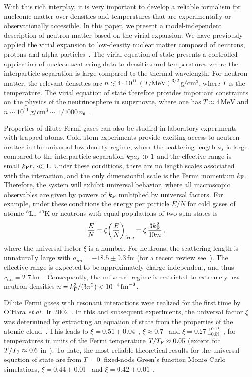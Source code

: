 \documentclass[aps,prc,twocolumn,showpacs,showkeys,amsmath,amssymb]{revtex4}
\newcommand{\kf}{k_{\rm F}}
\newcommand{\as}{a_s}
\newcommand{\re}{r_e}
\newcommand{\be}{\begin{equation}}
\newcommand{\ee}{\end{equation}}
\newcommand{\fm}{\, \text{fm}}
\newcommand{\mev}{\, \text{MeV}}
\newcommand{\gcq}{\, \text{g}/\text{cm}^{3}}
\begin{document}
With this rich interplay, it is very important to develop a reliable 
formalism for nucleonic matter over densities and temperatures 
that are experimentally or observationally accessible. In this 
paper, we present a model-independent description of neutron matter 
based on the virial expansion. We have previously applied the
virial expansion to low-density nuclear matter composed of neutrons, 
protons and alpha particles~\cite{vEOSnuc}.
The virial equation of state presents a controlled application of
nucleon scattering data to densities and temperatures where the 
interparticle separation is large compared to the thermal wavelength. 
For neutron matter, the relevant densities are
$n \lesssim 4 \cdot 10^{11} \, (T/\text{MeV})^{3/2} \gcq$,
where $T$ is the temperature. The virial equation of state
therefore provides important constraints on the physics of the
neutrinosphere in supernovae, where one has $T \approx 4 \mev$ 
and $n \sim 10^{11} \gcq \sim 1/1000 \, n_0$~\cite{sn1987a1,sn1987a2}.

Properties of dilute Fermi gases can also be studied in laboratory 
experiments with trapped atoms. Cold atom experiments provide
exciting access to neutron matter in the universal low-density
regime, where the scattering length $\as$ is large compared to
the interparticle separation $\kf \as \gg 1$ and the effective
range is small $\kf \re \ll 1$. Under these conditions, there 
are no length scales associated with the interaction, and the 
only dimensionful scale is the Fermi momentum $\kf$. Therefore, the
system will exhibit universal behavior, where all macroscopic 
observables are given by powers of $\kf$
multiplied by universal factors. For example, under these conditions 
the energy per particle $E/N$ for cold gases of atomic $^6$Li, $^{40}$K 
or neutrons with equal populations of two spin states is
\be
\frac{E}{N} = \xi \biggl( \frac{E}{N} \biggr)_{\rm free} = \xi \,
\frac{3 \kf^2}{10 m} \,,
\label{unieos}
\ee
where the universal factor $\xi$ is a number. For neutrons, the scattering 
length is unnaturally large with $a_{nn} = - 18.5 \pm 0.3 \fm$ (for a recent 
review see~\cite{Phillips}).
The effective range is expected to be approximately charge-independent,
and thus $r_{nn} = 2.7 \fm$~\cite{effrange}. Consequently, the universal
regime is restricted to extremely low neutron densities $n = \kf^3/
(3\pi^2) < 10^{-4} \fm^{-3}$.

Dilute Fermi gases with resonant interactions were realized for 
the first time by O'Hara {\it et al.}~in 2002~\cite{Thomas1}. In this
and subsequent experiments, the universal factor $\xi$ was determined 
by extracting an equation of state from the properties of the atomic 
cloud~\cite{Thomas1,Thomas2,Salomon,Grimm}. This
leads to $\xi = 0.51 \pm 0.04$~\cite{Thomas2}, 
$\xi \approx 0.7$~\cite{Salomon} and 
$\xi = 0.27\,^{+0.12}_{-0.09}$~\cite{Grimm}, for temperatures in units
of the Fermi temperature $T/T_{\rm F} \approx 0.05$ (except for 
$T/T_{\rm F} \approx 0.6$ in~\cite{Salomon}). To date, the most reliable 
theoretical results for the universal equation of state are from $T=0$, 
fixed-node Green's function Monte Carlo simulations, $\xi = 0.44 \pm 
0.01$~\cite{Carlson} and $\xi = 0.42 \pm 0.01$~\cite{Astra}.
\end{document}
